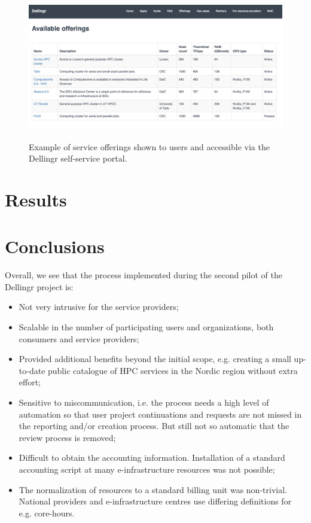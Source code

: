 \documentclass{article}
\newcommand{\dell}{Dellingr\xspace}
\newcommand{\einfra}{e-infrastructure\xspace}
\newcommand{\coreh}{core-hours\xspace}
\begin{document}
\begin{figure}
\centering
\includegraphics[height=180pt]{Dellingr-list-of-resource.png}
\caption{Example of service offerings shown to users and accessible via the \dell self-service portal.}
\label{fig:offerings}
\end{figure}

\section{Results}
\label{sec:results}


\section{Conclusions}

Overall, we see that the process implemented during the second pilot of the \dell project is:
\begin{itemize}
\item Not very intrusive for the service providers;
\item Scalable in the number of participating users and organizations, both consumers and service providers;
\item Provided additional benefits beyond the initial scope, e.g. creating a small up-to-date public catalogue of HPC services in the Nordic region without extra effort;
\item {Sensitive to miscommunication, i.e. the process needs a high level of automation so that user project continuations and requests are not missed in the reporting and/or creation process. But still not so automatic that the review process is removed;}
\item {Difficult to obtain the accounting information. Installation of a standard accounting script at many \einfra resources was not possible;}
\item{The normalization of resources to a standard billing unit was non-trivial. 
National providers and \einfra centres use differing definitions for e.g. \coreh.}
\end{itemize} 
\end{document}
